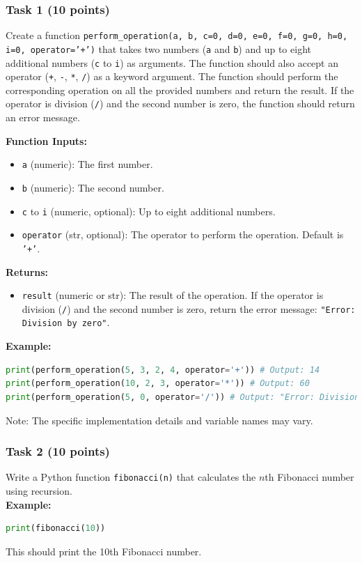 \documentclass[12pt]{article}
\begin{document}
\subsubsection{Task 1 (10 points)}
Create a function \texttt{perform\_operation(a, b, c=0, d=0, e=0, f=0, g=0, h=0, i=0, operator='+')} that takes two numbers (\texttt{a} and \texttt{b}) and up to eight additional numbers (\texttt{c} to \texttt{i}) as arguments. The function should also accept an operator (\texttt{+}, \texttt{-}, \texttt{*}, \texttt{/}) as a keyword argument. The function should perform the corresponding operation on all the provided numbers and return the result. If the operator is division (\texttt{/}) and the second number is zero, the function should return an error message.

\textbf{Function Inputs:}
\begin{itemize}
\item \texttt{a} (numeric): The first number.
\item \texttt{b} (numeric): The second number.
\item \texttt{c} to \texttt{i} (numeric, optional): Up to eight additional numbers.
\item \texttt{operator} (str, optional): The operator to perform the operation. Default is \texttt{'+'}.
\end{itemize}

\textbf{Returns:}
\begin{itemize}
\item \texttt{result} (numeric or str): The result of the operation. If the operator is division (\texttt{/}) and the second number is zero, return the error message: \texttt{"Error: Division by zero"}.
\end{itemize}

\textbf{Example:}
\begin{lstlisting}[language=Python]
print(perform_operation(5, 3, 2, 4, operator='+')) # Output: 14
print(perform_operation(10, 2, 3, operator='*')) # Output: 60
print(perform_operation(5, 0, operator='/')) # Output: "Error: Division by zero"
\end{lstlisting}

Note: The specific implementation details and variable names may vary.

\subsubsection{Task 2 (10 points)}
Write a Python function \texttt{fibonacci(n)} that calculates the $n$th Fibonacci number using recursion. \\
\textbf{Example:}
\begin{lstlisting}[language=Python]
print(fibonacci(10))
\end{lstlisting}
This should print the 10th Fibonacci number.
\end{document}
